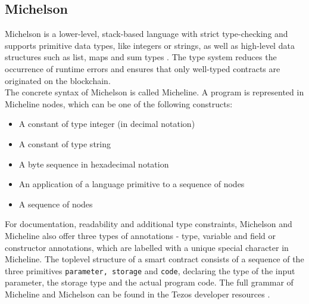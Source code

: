 \subsection{Michelson}
Michelson is a lower-level, stack-based language with strict type-checking and supports primitive data types, like integers or strings, as well as high-level data structures such as list, maps and sum types \cite{tezos_docs}. The type system reduces the occurrence of runtime errors and ensures that only well-typed contracts are originated on the blockchain. \\
The concrete syntax of Michelson is called Micheline. A program is represented in Micheline nodes, which can be one of the following constructs:
\begin{itemize}
\item A constant of type integer (in decimal notation)
\item A constant of type string
\item A byte sequence in hexadecimal notation
\item An application of a language primitive to a sequence of nodes
\item A sequence of nodes
\end{itemize}
For documentation, readability and additional type constraints, Michelson and Micheline also offer three types of annotations - type, variable and field or constructor annotations, which are labelled with a unique special character in Micheline. The toplevel structure of a smart contract consists of a sequence of the three primitives \texttt{parameter, storage} and \texttt{code}, declaring the type of the input parameter, the storage type and the actual program code. The full grammar of Micheline and Michelson can be found in the Tezos developer resources \cite{tezos_docs}.

